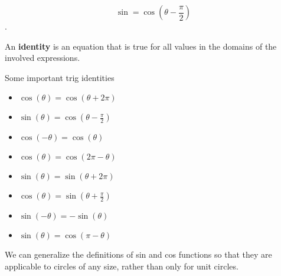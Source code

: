 \[ \sin = \cos \left(\theta - \frac{\pi}{2}\right) \].

\begin{definition}[Identity]
  \label{def:identity}

  An \textbf{identity} is an equation that is true for all values in the domains
  of the involved expressions.
\end{definition}

\begin{tcolorbox}
  \begin{center}
    Some important trig identities
  \end{center}

  \begin{minipage}[t]{.50\textwidth}
      \begin{itemize}
      \item $\cos (\theta) = \cos (\theta + 2\pi)$
      \item $\sin (\theta) = \cos \left(\theta - \frac{\pi}{2}\right)$ 
      \item $\cos (-\theta) = \cos (\theta)$
      \item $\cos (\theta) = \cos (2\pi - \theta)$
    \end{itemize}
  \end{minipage}%
  \begin{minipage}[t]{.50\textwidth}
   \begin{itemize}
      \item $\sin (\theta) = \sin (\theta + 2\pi)$
      \item $\cos (\theta) = \sin \left(\theta + \frac{\pi}{2}\right)$ 
      \item $\sin (-\theta) = -\sin (\theta)$
      \item $\sin (\theta) = \cos (\pi - \theta)$
    \end{itemize}
  \end{minipage}
\end{tcolorbox}

We can generalize the definitions of sin and cos functions so that they are
applicable to circles of any size, rather than only for unit circles.

